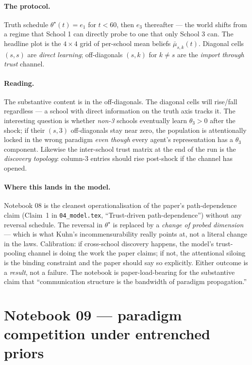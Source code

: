 \documentclass[11pt,a4paper]{article}
\theoremstyle{plain}
\begin{document}
\paragraph{The protocol.} Truth schedule
$\theta^\star(t)=e_1$ for $t<60$, then $e_3$ thereafter --- the world
shifts from a regime that School 1 can directly probe to one that only
School 3 can. The headline plot is the $4\times 4$ grid of per-school
mean beliefs $\bar\mu_{s,k}(t)$. Diagonal cells $(s,s)$ are
\emph{direct learning}; off-diagonals $(s,k)$ for $k\neq s$ are the
\emph{import through trust} channel.

\paragraph{Reading.} The substantive content is in the off-diagonals.
The diagonal cells will rise/fall regardless --- a school with direct
information on the truth axis tracks it. The interesting question is
whether \emph{non-3} schools eventually learn $\theta_3>0$ after the
shock; if their $(s,3)$ off-diagonals stay near zero, the population is
attentionally locked in the wrong paradigm \emph{even though} every
agent's representation has a $\theta_3$ component. Likewise the
inter-school trust matrix at the end of the run is the \emph{discovery
topology}: column-3 entries should rise post-shock if the channel has
opened.

\paragraph{Where this lands in the model.} Notebook 08 is the cleanest
operationalisation of the paper's path-dependence claim
(Claim~1 in \texttt{04\_model.tex}, ``Trust-driven path-dependence'')
without any reversal schedule. The reversal in $\theta^\star$ is
replaced by a \emph{change of probed dimension} --- which is what
Kuhn's incommensurability really points at, not a literal change in the
laws. Calibration: if cross-school discovery happens, the model's
trust-pooling channel is doing the work the paper claims; if not, the
attentional siloing is the binding constraint and the paper should say
so explicitly. Either outcome is a \emph{result}, not a failure. The
notebook is paper-load-bearing for the substantive claim that
``communication structure is the bandwidth of paradigm propagation.''

\section{Notebook 09 --- paradigm competition under entrenched priors}
\label{sec:nb09}
\end{document}
